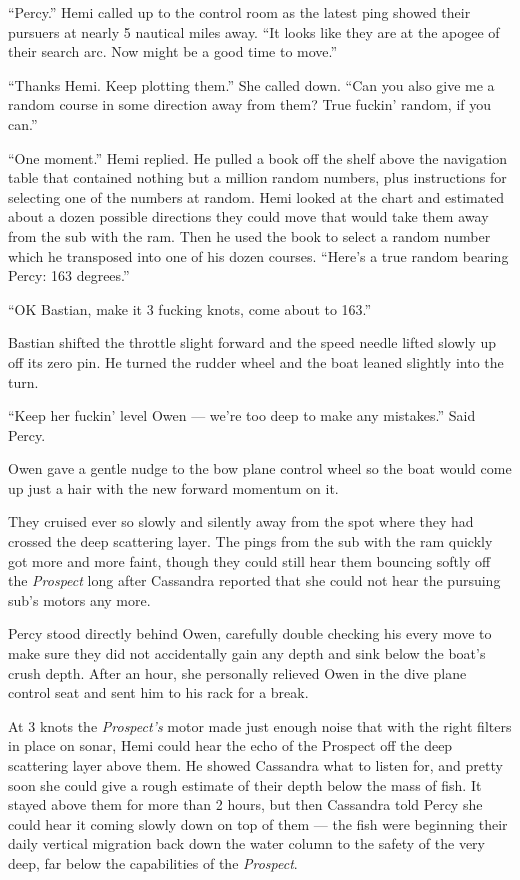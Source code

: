 \documentclass[]{scrbook}
\begin{document}
``Percy.'' Hemi called up to the control room as the latest ping showed
their pursuers at nearly 5 nautical miles away. ``It looks like they are
at the apogee of their search arc. Now might be a good time to move.''

``Thanks Hemi. Keep plotting them.'' She called down. ``Can you also
give me a random course in some direction away from them? True fuckin'
random, if you can.''

``One moment.'' Hemi replied. He pulled a book off the shelf above the
navigation table that contained nothing but a million random numbers,
plus instructions for selecting one of the numbers at random. Hemi
looked at the chart and estimated about a dozen possible directions they
could move that would take them away from the sub with the ram. Then he
used the book to select a random number which he transposed into one of
his dozen courses. ``Here's a true random bearing Percy: 163 degrees.''

``OK Bastian, make it 3 fucking knots, come about to 163.''

Bastian shifted the throttle slight forward and the speed needle lifted
slowly up off its zero pin. He turned the rudder wheel and the boat
leaned slightly into the turn.

``Keep her fuckin' level Owen --- we're too deep to make any mistakes.''
Said Percy.

Owen gave a gentle nudge to the bow plane control wheel so the boat
would come up just a hair with the new forward momentum on it.

They cruised ever so slowly and silently away from the spot where they
had crossed the deep scattering layer. The pings from the sub with the
ram quickly got more and more faint, though they could still hear them
bouncing softly off the \emph{Prospect} long after Cassandra reported
that she could not hear the pursuing sub's motors any more.

Percy stood directly behind Owen, carefully double checking his every
move to make sure they did not accidentally gain any depth and sink
below the boat's crush depth. After an hour, she personally relieved
Owen in the dive plane control seat and sent him to his rack for a
break.

At 3 knots the \emph{Prospect's} motor made just enough noise that with
the right filters in place on sonar, Hemi could hear the echo of the
Prospect off the deep scattering layer above them. He showed Cassandra
what to listen for, and pretty soon she could give a rough estimate of
their depth below the mass of fish. It stayed above them for more than 2
hours, but then Cassandra told Percy she could hear it coming slowly
down on top of them --- the fish were beginning their daily vertical
migration back down the water column to the safety of the very deep, far
below the capabilities of the \emph{Prospect}.
\end{document}
